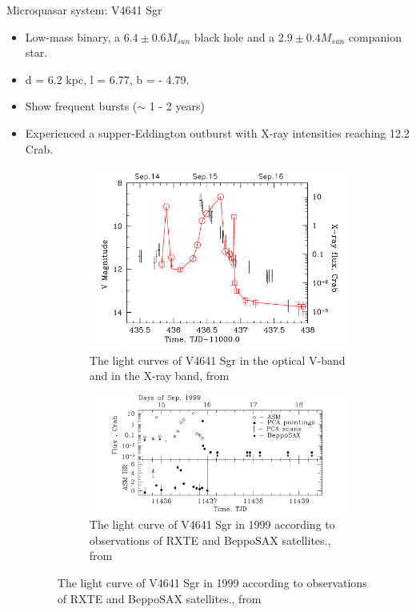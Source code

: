 \documentclass[10pt,aspectratio=169,mathserif]{beamer}
\begin{document}
\begin{frame}{Microquasar system: V4641 Sgr}
\begin{itemize}
    \item {Low-mass binary}, a $6.4\pm0.6 M_{sun} $ black hole and a $ 2.9\pm0.4M_{sun} $ companion star.
    \item d = 6.2 kpc, l = 6.77, b = - 4.79. 
    \item Show frequent bursts ($\sim$ 1 - 2 years)
    \item {Experienced a supper-Eddington outburst with X-ray intensities reaching 12.2 Crab.}
    \begin{figure}[ht]
    \centering
    \begin{subfigure}[t]{0.50\linewidth}
        \includegraphics[width=0.7\linewidth]{1999_01.png}
        \caption{The light curves of V4641 Sgr in the optical V-band and in the X-ray band, from \cite{revnivtsev2002v4641sgr}}
        \label{fig:sub1}
    \end{subfigure}%
    \hfill %
    \begin{subfigure}[t]{0.50\linewidth}
        \includegraphics[width=\linewidth]{1999_02.png}
        \caption{The light curve of V4641 Sgr in 1999 according to observations of RXTE and BeppoSAX satellites., from \cite{revnivtsev2002super}}
        \label{fig:sub2}
    \end{subfigure}%
\end{figure}
\end{itemize}
    
\end{frame}
\end{document}
